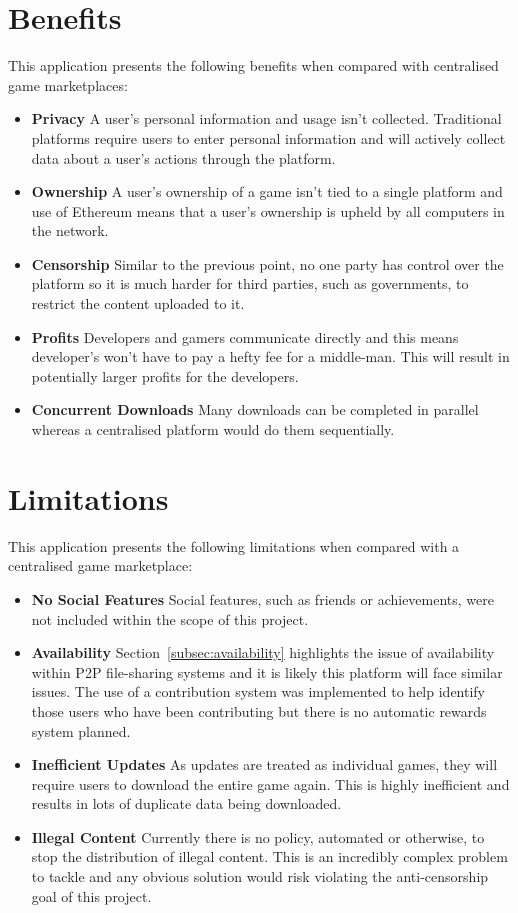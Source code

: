 
\section{Benefits}\label{des:benefits}

This application presents the following benefits when compared with centralised game marketplaces:

\begin{itemize}
  \item \textbf{Privacy} A user's personal information and usage isn't collected. Traditional platforms require users to enter personal information and will actively collect data about a user's actions through the platform.
  \item \textbf{Ownership} A user's ownership of a game isn't tied to a single platform and use of Ethereum means that a user's ownership is upheld by all computers in the network.
  \item \textbf{Censorship} Similar to the previous point, no one party has control over the platform so it is much harder for third parties, such as governments, to restrict the content uploaded to it.
  \item \textbf{Profits} Developers and gamers communicate directly and this means developer's won't have to pay a hefty fee for a middle-man. This will result in potentially larger profits for the developers.  
  \item \textbf{Concurrent Downloads} Many downloads can be completed in parallel whereas a centralised platform would do them sequentially.
\end{itemize}

\section{Limitations}\label{sec:design-lim}

This application presents the following limitations when compared with a centralised game marketplace:

\begin{itemize}
  \item \textbf{No Social Features} Social features, such as friends or achievements, were not included within the scope of this project.
  \item \textbf{Availability} Section~\ref{subsec:availability} highlights the issue of availability within P2P file-sharing systems and it is likely this platform will face similar issues.
  The use of a contribution system was implemented to help identify those users who have been contributing but there is no automatic rewards system planned.
  \item \textbf{Inefficient Updates} As updates are treated as individual games, they will require users to download the entire game again. This is highly inefficient and results in lots of duplicate data being downloaded.
  \item \textbf{Illegal Content} Currently there is no policy, automated or otherwise, to stop the distribution of illegal content. This is an incredibly complex problem to tackle and any obvious solution would risk violating the anti-censorship goal of this project.
\end{itemize}